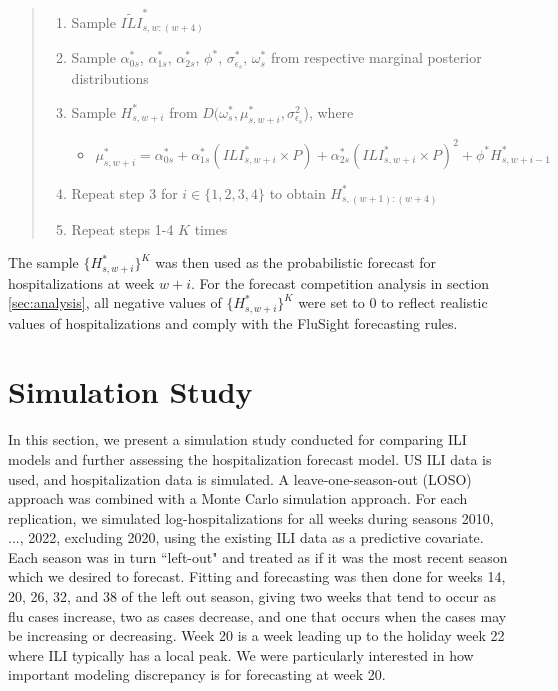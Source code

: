 \documentclass[ba]{imsart}
\theoremstyle{plain}
\theoremstyle{definition}
\theoremstyle{remark}
\begin{document}
\begin{quote}
\begin{enumerate}[Step 1:]
  \item Sample $\widetilde{ILI}^*_{s,w:(w + 4)}$
  \item Sample $\alpha_{0s}^*$, $\alpha_{1s}^*$, $\alpha_{2s}^*$, $\phi^*$, $\sigma^*_{\epsilon_s}$, $\omega^*_s$ from respective marginal posterior distributions
  \item Sample $H^*_{s,w + i}$ from $D(\omega_s^*, \mu_{s, w + i}^*,\sigma^2_{\epsilon_s}$), where
  \begin{itemize}
    \item[] $\mu_{s,w + i}^* = \alpha_{0s}^* + \alpha_{1s}^* (ILI_{s,w + i}^* \times P) + \alpha_{2s}^* (ILI_{s,w + i}^* \times P)^2 + \phi^* H^*_{s,w + i - 1}$
  \end{itemize}
   \item Repeat step 3 for $i \in \{1,2,3,4\}$ to obtain $H^*_{s,(w + 1):(w + 4)}$
  \item Repeat steps 1-4 $K$ times
\end{enumerate}
\end{quote}
The sample $\{H^*_{s,w + i}\}^K$ was then used as the probabilistic forecast for hospitalizations at week $w + i$. For the forecast competition analysis in section \ref{sec:analysis}, all negative values of $\{H^*_{s,w + i}\}^K$ were set to 0 to reflect realistic values of hospitalizations and comply with the FluSight forecasting rules.


















\section{Simulation Study} \label{sec:simulation2}
In this section, we present a simulation study conducted for comparing ILI models and further assessing the hospitalization forecast model. US ILI data is used, and hospitalization data is simulated. 
A leave-one-season-out (LOSO) approach was combined with a Monte Carlo simulation approach. For each replication, we simulated log-hospitalizations for all weeks during seasons 2010, ..., 2022, excluding 2020, using the existing ILI data as a predictive covariate. Each season was in turn ``left-out" and treated as if it was the most recent season which we desired to forecast. Fitting and forecasting was then done for weeks 14, 20, 26, 32, and 38 of the left out season, giving two weeks that tend to occur as flu cases increase, two as cases decrease, and one that occurs when the cases may be increasing or decreasing. Week 20 is a week leading up to the holiday week 22 where ILI typically has a local peak. We were particularly interested in how important modeling discrepancy is for forecasting at week 20.
\end{document}
